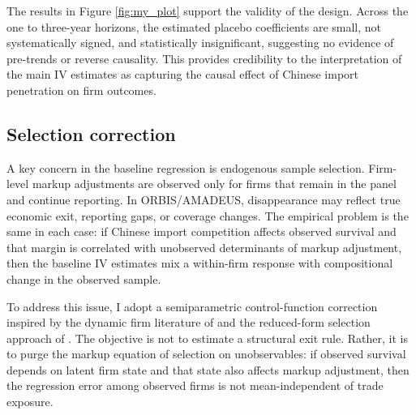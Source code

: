 \documentclass[12pt]{article}
\begin{document}
The results in Figure \ref{fig:my_plot} support the validity of the design. Across the one to three-year horizons, the estimated placebo coefficients are small, not systematically signed, and statistically insignificant, suggesting no evidence of pre-trends or reverse causality. This provides credibility to the interpretation of the main IV estimates as capturing the causal effect of Chinese import penetration on firm outcomes.

\subsection{Selection correction}

A key concern in the baseline regression is endogenous sample selection. Firm-level markup adjustments are observed only for firms that remain in the panel and continue reporting. In ORBIS/AMADEUS, disappearance may reflect true economic exit, reporting gaps, or coverage changes. The empirical problem is the same in each case: if Chinese import competition affects observed survival and that margin is correlated with unobserved determinants of markup adjustment, then the baseline IV estimates mix a within-firm response with compositional change in the observed sample.

To address this issue, I adopt a semiparametric control-function correction inspired by the dynamic firm literature of \textcite{ericsonMarkovPerfectIndustryDynamics1995} and the reduced-form selection approach of \textcite{backusWhyProductivityCorrelated2020}. The objective is not to estimate a structural exit rule. Rather, it is to purge the markup equation of selection on unobservables: if observed survival depends on latent firm state and that state also affects markup adjustment, then the regression error among observed firms is not mean-independent of trade exposure.
\end{document}
